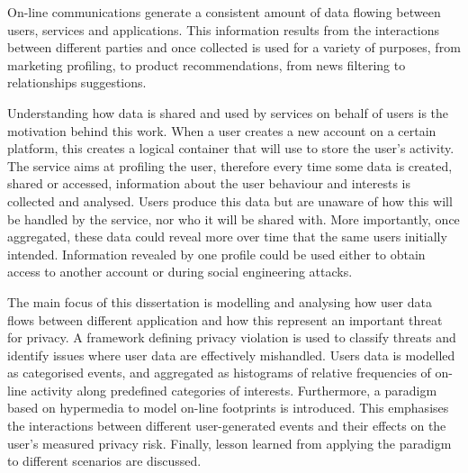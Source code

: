 On-line communications generate a consistent amount of data flowing between users, services and applications. This information results from the interactions between different parties and once collected is used for a variety of purposes, from marketing profiling, to product recommendations, from news filtering to relationships suggestions. 

Understanding how data is shared and used by services on behalf of users is the motivation behind this work.  When a user creates a new account on a certain platform, this creates a logical container that will use to store the user's activity. The service aims at profiling the user, therefore every time some data is created, shared or accessed, information about the user behaviour and interests is collected and analysed. Users produce this data but are unaware of how this will be handled by the service, nor who it will be shared with. More importantly, once aggregated, these data could reveal more over time that the same users initially intended. Information revealed by one profile could be used either to obtain access to another account or during social engineering attacks.

The main focus of this dissertation is modelling and analysing how user data flows between different application and how this represent an important threat for privacy. A framework defining privacy violation is used to classify threats and identify issues where user data are effectively mishandled. Users data is modelled as categorised events, and aggregated as histograms of relative frequencies of on-line activity along predefined categories of interests. Furthermore, a paradigm based on hypermedia to model on-line footprints is introduced. This emphasises the interactions between different user-generated events and their effects on the user’s measured privacy risk. Finally, lesson learned from applying the paradigm to different scenarios are discussed.